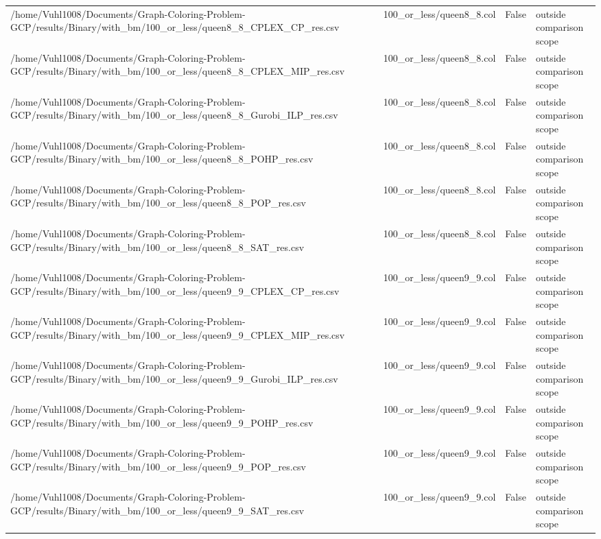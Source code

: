 \begin{table}[htbp]
\begin{tabular}{llll}
/home/Vuhl1008/Documents/Graph-Coloring-Problem-GCP/results/Binary/with\_bm/100\_or\_less/queen8\_8\_CPLEX\_CP\_res.csv & 100\_or\_less/queen8\_8.col & False & outside comparison scope \\
/home/Vuhl1008/Documents/Graph-Coloring-Problem-GCP/results/Binary/with\_bm/100\_or\_less/queen8\_8\_CPLEX\_MIP\_res.csv & 100\_or\_less/queen8\_8.col & False & outside comparison scope \\
/home/Vuhl1008/Documents/Graph-Coloring-Problem-GCP/results/Binary/with\_bm/100\_or\_less/queen8\_8\_Gurobi\_ILP\_res.csv & 100\_or\_less/queen8\_8.col & False & outside comparison scope \\
/home/Vuhl1008/Documents/Graph-Coloring-Problem-GCP/results/Binary/with\_bm/100\_or\_less/queen8\_8\_POHP\_res.csv & 100\_or\_less/queen8\_8.col & False & outside comparison scope \\
/home/Vuhl1008/Documents/Graph-Coloring-Problem-GCP/results/Binary/with\_bm/100\_or\_less/queen8\_8\_POP\_res.csv & 100\_or\_less/queen8\_8.col & False & outside comparison scope \\
/home/Vuhl1008/Documents/Graph-Coloring-Problem-GCP/results/Binary/with\_bm/100\_or\_less/queen8\_8\_SAT\_res.csv & 100\_or\_less/queen8\_8.col & False & outside comparison scope \\
/home/Vuhl1008/Documents/Graph-Coloring-Problem-GCP/results/Binary/with\_bm/100\_or\_less/queen9\_9\_CPLEX\_CP\_res.csv & 100\_or\_less/queen9\_9.col & False & outside comparison scope \\
/home/Vuhl1008/Documents/Graph-Coloring-Problem-GCP/results/Binary/with\_bm/100\_or\_less/queen9\_9\_CPLEX\_MIP\_res.csv & 100\_or\_less/queen9\_9.col & False & outside comparison scope \\
/home/Vuhl1008/Documents/Graph-Coloring-Problem-GCP/results/Binary/with\_bm/100\_or\_less/queen9\_9\_Gurobi\_ILP\_res.csv & 100\_or\_less/queen9\_9.col & False & outside comparison scope \\
/home/Vuhl1008/Documents/Graph-Coloring-Problem-GCP/results/Binary/with\_bm/100\_or\_less/queen9\_9\_POHP\_res.csv & 100\_or\_less/queen9\_9.col & False & outside comparison scope \\
/home/Vuhl1008/Documents/Graph-Coloring-Problem-GCP/results/Binary/with\_bm/100\_or\_less/queen9\_9\_POP\_res.csv & 100\_or\_less/queen9\_9.col & False & outside comparison scope \\
/home/Vuhl1008/Documents/Graph-Coloring-Problem-GCP/results/Binary/with\_bm/100\_or\_less/queen9\_9\_SAT\_res.csv & 100\_or\_less/queen9\_9.col & False & outside comparison scope \\

\end{tabular}
\end{table}
